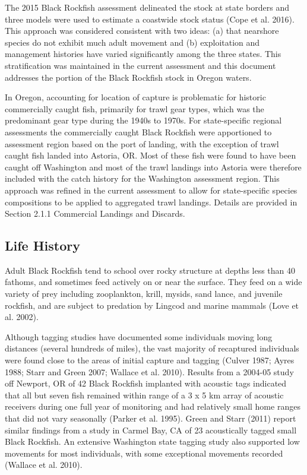 \documentclass[11pt,
  letterpaper,
]{article}
\begin{document}
The 2015 Black Rockfish assessment delineated the stock at state borders and three models were used to estimate a coastwide stock status (Cope et al. 2016). This approach was considered consistent with two ideas: (a) that nearshore species do not exhibit much adult movement and (b) exploitation and management histories have varied significantly among the three states. This stratification was maintained in the current assessment and this document addresses the portion of the Black Rockfish stock in Oregon waters.

In Oregon, accounting for location of capture is problematic for historic commercially caught fish, primarily for trawl gear types, which was the predominant gear type during the 1940s to 1970s. For state-specific regional assessments the commercially caught Black Rockfish were apportioned to assessment region based on the port of landing, with the exception of trawl caught fish landed into Astoria, OR. Most of these fish were found to have been caught off Washington and most of the trawl landings into Astoria were therefore included with the catch history for the Washington assessment region. This approach was refined in the current assessment to allow for state-specific species compositions to be applied to aggregated trawl landings. Details are provided in Section 2.1.1 Commercial Landings and Discards.

\hypertarget{life-history}{%
\subsection{Life History}\label{life-history}}

Adult Black Rockfish tend to school over rocky structure at depths less than 40 fathoms, and sometimes feed actively on or near the surface. They feed on a wide variety of prey including zooplankton, krill, mysids, sand lance, and juvenile rockfish, and are subject to predation by Lingcod and marine mammals (Love et al. 2002).

Although tagging studies have documented some individuals moving long distances (several hundreds of miles), the vast majority of recaptured individuals were found close to the areas of initial capture and tagging (Culver 1987; Ayres 1988; Starr and Green 2007; Wallace et al. 2010). Results from a 2004-05 study off Newport, OR of 42 Black Rockfish implanted with acoustic tags indicated that all but seven fish remained within range of a 3 x 5 km array of acoustic receivers during one full year of monitoring and had relatively small home ranges that did not vary seasonally (Parker et al. 1995). Green and Starr (2011) report similar findings from a study in Carmel Bay, CA of 23 acoustically tagged small Black Rockfish. An extensive Washington state tagging study also supported low movements for most individuals, with some exceptional movements recorded (Wallace et al. 2010).
\end{document}
